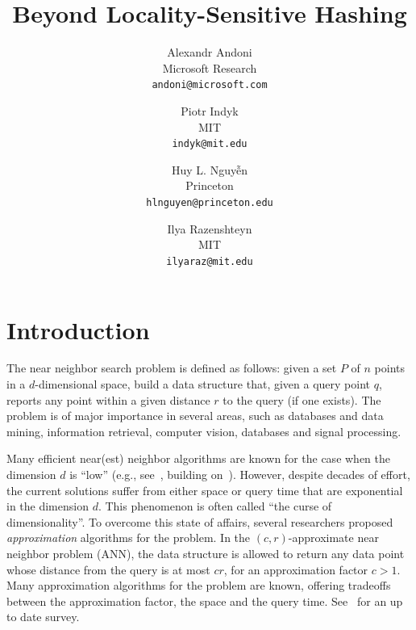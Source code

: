 \documentclass[11pt,letterpaper]{article}
\begin{document}
    \title{Beyond Locality-Sensitive Hashing}
    \author{Alexandr Andoni\\ Microsoft Research \\ \texttt{\small andoni@microsoft.com} \and Piotr Indyk\\ MIT\\\texttt{\small indyk@mit.edu} \and Huy L. Nguy\~{\^{e}}n\\ Princeton \\ \texttt{\small hlnguyen@princeton.edu} \and Ilya Razenshteyn \\ MIT \\ \texttt{\small ilyaraz@mit.edu}}
    \date{\vspace{-5ex}}
    
\maketitle



\section{Introduction}

The near neighbor search problem  is defined as follows:
given a set $P$ of $n$ points in a $d$-dimensional space,  build a data structure that, given a query point $q$,  reports any point within a given distance $r$
to the query (if one exists). 
The problem is of major importance in several
areas, such as databases
and data mining, information retrieval, computer vision, 
databases and signal processing.

Many efficient near(est) neighbor  algorithms are known for the case when the dimension $d$ is ``low'' (e.g., see~\cite{m-plah-93}, building on~\cite{c-racpq-88}). 
However, despite decades of effort, the
current solutions suffer from either space or query time that
are exponential in the dimension $d$. This phenomenon is often called ``the curse of dimensionality''.
 To overcome this state of affairs, several researchers proposed {\em approximation} algorithms for the problem.
In the $(c, r)$-approximate near neighbor problem (ANN), the data structure is allowed to
return any data point whose distance from the query is at most $c r$, for an approximation factor $c > 1$.  Many approximation algorithms for the problem are known, offering tradeoffs between the approximation factor, the space and the query time. See~\cite{a-nnson-09} for an up to date survey. 
\end{document}
